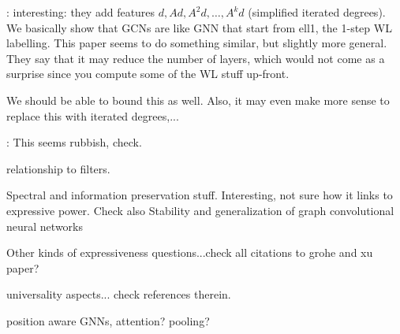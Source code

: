 \cite{chen2019powerful}: interesting: they add features $d, Ad, A^2d,\ldots, A^kd$
(simplified iterated degrees). We basically show that GCNs are like GNN that start from ell1, the 1-step WL labelling. This paper seems to do something similar, but slightly more general. They say that it may reduce the number of layers, which would not come as a surprise since you compute some of the WL stuff up-front.

 We should be able to bound this as well. Also, it may even make more sense to replace this with iterated degrees,...

\cite{atamna2019principled}: This seems rubbish, check.

\cite{Hoang2019RevisitingGN} relationship to filters.

\cite{Grel2019AnAO} Spectral and information preservation stuff. Interesting, not sure how it links to expressive power.
Check also Stability and generalization of graph convolutional neural networks

Other kinds of expressiveness questions...check all citations to grohe and xu paper?

\cite{DBLP:journals/corr/abs-1901-09342} universality aspects... check references therein.

position aware GNNs, attention? pooling?
